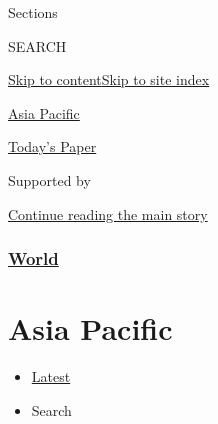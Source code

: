Sections

SEARCH

\protect\hyperlink{site-content}{Skip to
content}\protect\hyperlink{site-index}{Skip to site index}

\href{https://www.nytimes.com/section/world/asia}{Asia Pacific}

\href{https://myaccount.nytimes.com/auth/login?response_type=cookie\&client_id=vi}{}

\href{https://www.nytimes.com/section/todayspaper}{Today's Paper}

Supported by

\protect\hyperlink{after-sponsor}{Continue reading the main story}

\hypertarget{world}{%
\subsubsection{\texorpdfstring{\href{/section/world}{World}}{World}}\label{world}}

\hypertarget{asia-pacific}{%
\section{Asia Pacific}\label{asia-pacific}}

\begin{itemize}
\tightlist
\item
  \protect\hyperlink{stream-panel}{Latest}
\item
  Search
\end{itemize}


